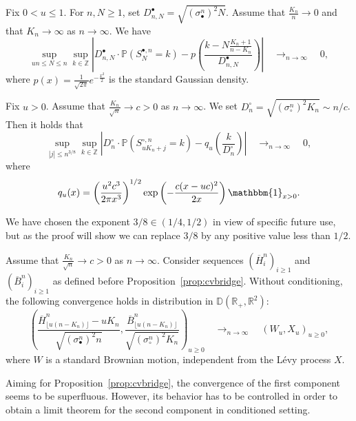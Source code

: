 \documentclass[AHL,XML,longabstracts,Unicode]{cedram}
\newcommand{\Z}{\mathbb{Z}}
\newcommand{\R}{\mathbb{R}}
\def\scn{\sigma_{\circ}^{n}}
\def\sbn{\sigma_{\bullet}^{n}}
\def\Sbn{S^{\bullet,n}}
\def\Scn{S^{\circ,n}}
\def\DbnN{D^{\bullet}_{n,N}}
\def\Dcn{D^{\circ}_{n}}
\def\oB{\overline{B}}
\def\oH{\overline{H}}
\renewcommand\Pr[1]{\mathbb{P}\left(#1\right)}
\begin{document}
\begin{lemma} \label{lem:ll1}
  Fix $0<u \leq 1$. For $n,N \geq 1$,  set  $\DbnN= \sqrt{ (\sbn)^{2}  N}$. Assume that $ \tfrac{K_{n}}{n} \rightarrow 0$ and that $K_{n} \rightarrow \infty$ as $n \rightarrow \infty$.
  We have
  \[  \sup_{un \leq N  \leq n} \sup_{k \in \Z  } \left|  \DbnN  \cdot \Pr{\Sbn_N=k}
  -   p \left( \frac{k- N\tfrac{K_n+1}{n-K_n}}
  {  \DbnN  }\right)\right|  \quad \mathop{\longrightarrow}_{n \rightarrow \infty} \quad 0,\]
  where $p(x)= \frac{1}{\sqrt{2 \pi}} e^{- \frac{x^{2}}{2}}$ is the standard Gaussian density.
  \label{lem:ll1Uniforme}
\end{lemma}



\begin{lemma}\label{lem:ll2}
 Fix $u>0$. Assume that $ \tfrac{K_{n}}{\sqrt{n}} \rightarrow c>0$ as $n \rightarrow \infty$.  We set $\Dcn=\sqrt{ (\scn)^{2} K_{n} } \sim n /c$.
 Then it holds that
\[ \sup_{|j| \leq n^{3/8}} \sup_{k \in \Z} \left|  \Dcn \cdot \Pr{\Scn_{ uK_{n}  + j }=k} -  q_{u} \left( \frac{k}{  \Dcn }\right)\right|  \quad \mathop{\longrightarrow}_{n \rightarrow \infty} \quad 0,\]
where
\begin{equation}
\label{eq:defqu}q_{u}(x)=\left( \frac{u^{2} c^{3}}{2 \pi x^{3}} \right)^{1/2} \exp \left(  - \frac{c (x-uc)^{2} }{2x} \right) \mathbbm{1}_{x>0}.
\end{equation}\end{lemma}


We have chosen the exponent $3/8 \in (1/4,1/2)$ in view of specific future use,  but as the proof will show we can replace $3/8$ by  any positive value less than $1/2$.


   \begin{lemma}\label{lem:cvnoncond}
  Assume that $ \tfrac{K_{n}}{\sqrt{n}} \rightarrow c>0$ as $n \rightarrow \infty$.
  Consider sequences $(\oH^{n}_i)_{i \ge 1}$ and $(\oB^{n}_i)_{i \ge 1}$ as defined before Proposition~\ref{prop:cvbridge}.
  Without conditioning, the following convergence holds in distribution in $\mathbb{D}(\R_{+},\R^{2})$:
  \[ \left(  \frac{\oH^{n}_{ \lfloor u (n-K_{n}) \rfloor } - u K_{n} }{\sqrt{ (\sbn)^{2} n} },  \frac{\oB^{n}_{ \lfloor u (n-K_{n}) \rfloor }}{\sqrt{ (\scn)^{2} K_{n}}} \right)_{u \geq 0}  \quad \mathop{\longrightarrow}_{n \rightarrow \infty} \quad  (W_{u},X_{u})_{u \geq 0},\]
 where $W$ is a standard Brownian motion, independent from the L\'evy process $X$.
  \end{lemma}

 Aiming for Proposition~\ref{prop:cvbridge}, the convergence of the first component seems to be superfluous.
 However,  its behavior has to be controlled in order to obtain a limit theorem for the second component
 in conditioned setting.
\end{document}

